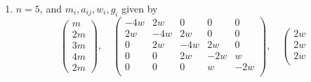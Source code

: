 \begin{lemma}
\begin{enumerate}
\label{models-item-equal-equal-up-equal}
$n = 5$, and $m_i, a_{ij}, w_i, g_i$ given by
$$
\left(
\begin{matrix}
m \\
2m \\
3m \\
2m \\
m
\end{matrix}
\right),
\quad
\left(
\begin{matrix}
-2w & w & 0 & 0 & 0 \\
w & -2w & w & 0 & 0 \\
0 & w & -2w & 2w & 0 \\
0 & 0 & 2w & -4w & 2w \\
0 & 0 & 0 & 2w & -4w \\
\end{matrix}
\right),
\quad
\left(
\begin{matrix}
w \\
w \\
w \\
2w \\
2w
\end{matrix}
\right),
\quad
\left(
\begin{matrix}
0 \\
0 \\
0 \\
0 \\
0
\end{matrix}
\right)
$$
with $w$ and $m$ arbitrary,
\item
\label{models-item-equal-equal-down-equal}
$n = 5$, and $m_i, a_{ij}, w_i, g_i$ given by
$$
\left(
\begin{matrix}
m \\
2m \\
3m \\
4m \\
2m
\end{matrix}
\right),
\quad
\left(
\begin{matrix}
-4w & 2w & 0 & 0 & 0 \\
2w & -4w & 2w & 0 & 0 \\
0 & 2w & -4w & 2w & 0 \\
0 & 0 & 2w & -2w & w \\
0 & 0 & 0 & w & -2w \\
\end{matrix}
\right),
\quad
\left(
\begin{matrix}
2w \\
2w \\
2w \\

\end{matrix}$$
\end{enumerate}
\end{lemma}
